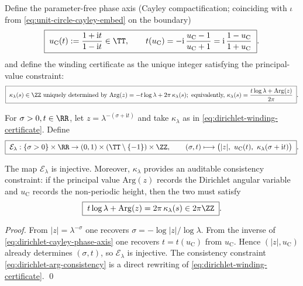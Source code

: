\medskip
Define the parameter-free phase axis (Cayley compactification; coinciding with \(\iota\) from \eqref{eq:unit-circle-cayley-embed} on the boundary)
\begin{equation}\label{eq:dirichlet-cayley-phase-axis}
\boxed{\;
u_{\mathrm C}(t):=\frac{1+\mathrm{i}t}{1-\mathrm{i}t}\in\TT,
\qquad
t(u_{\mathrm C})=-\mathrm{i}\,\frac{u_{\mathrm C}-1}{u_{\mathrm C}+1}
=\mathrm{i}\,\frac{1-u_{\mathrm C}}{1+u_{\mathrm C}}\; }.
\end{equation}
and define the winding certificate as the unique integer satisfying the principal-value constraint:
\begin{equation}\label{eq:dirichlet-winding-certificate}
\boxed{\;
\kappa_{\lambda}(s)\in\ZZ
\ \text{uniquely determined by}\
\mathrm{Arg}(z)=-t\log\lambda+2\pi\,\kappa_{\lambda}(s);
\ \text{equivalently,}\
\kappa_{\lambda}(s)=\frac{t\log\lambda+\mathrm{Arg}(z)}{2\pi}\; }.
\end{equation}

\begin{definition}\label{def:dirichlet-trifiber-injection}
For \(\sigma>0,t\in\RR\), let \(z=\lambda^{-(\sigma+\mathrm{i}t)}\) and take \(\kappa_{\lambda}\) as in \eqref{eq:dirichlet-winding-certificate}.
Define
\begin{equation}\label{eq:dirichlet-trifiber-injection-map}
\boxed{\;
\mathcal{E}_{\lambda}:\{\sigma>0\}\times\RR\to (0,1)\times(\TT\setminus\{-1\})\times\ZZ,\qquad
(\sigma,t)\longmapsto \bigl(|z|,\ u_{\mathrm C}(t),\ \kappa_{\lambda}(\sigma+\mathrm{i}t)\bigr)\; }.
\end{equation}
\end{definition}

\begin{proposition}\label{prop:dirichlet-trifiber-injection-audit}
The map \(\mathcal{E}_{\lambda}\) is injective.
Moreover, \(\kappa_{\lambda}\) provides an auditable consistency constraint:
if the principal value \(\mathrm{Arg}(z)\) records the Dirichlet angular variable and \(u_{\mathrm C}\) records the non-periodic height, then the two must satisfy
\begin{equation}\label{eq:dirichlet-arg-consistency}
\boxed{\;t\log\lambda+\mathrm{Arg}(z)=2\pi\,\kappa_{\lambda}(s)\in 2\pi\ZZ\; }.
\end{equation}
\end{proposition}
\begin{proof}
From \(|z|=\lambda^{-\sigma}\) one recovers \(\sigma=-\log|z|/\log\lambda\).
From the inverse of \eqref{eq:dirichlet-cayley-phase-axis} one recovers \(t=t(u_{\mathrm C})\) from \(u_{\mathrm C}\).
Hence \((|z|,u_{\mathrm C})\) already determines \((\sigma,t)\), so \(\mathcal{E}_{\lambda}\) is injective.
The consistency constraint \eqref{eq:dirichlet-arg-consistency} is a direct rewriting of \eqref{eq:dirichlet-winding-certificate}. \qed
\end{proof}

